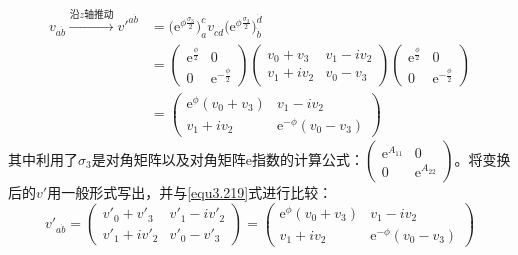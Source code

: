 \begin{align}
    v_{a\dot{b}} \stackrel{\text{沿} z \text{轴推动}}{\longrightarrow} v'^{a\dot{b}} &= \Big(\mathrm{e}^{\phi \frac{\sigma_3}{2}} \Big)^c_a v_{c \dot{d}} \Big( \mathrm{e}^{\phi \frac{\sigma_3}{2}} \Big)^{\dot{d}}_{\dot{b}} \nonumber \\
    &=  \begin{pmatrix}
            \mathrm{e}^{\frac{\phi}{2}} & 0 \\
            0 & \mathrm{e}^{- \frac{\phi}{2}}
        \end{pmatrix}
        \begin{pmatrix}
            v_0 + v_3 & v_1 - iv_2 \\
            v_1 + iv_2 & v_0 - v_3
        \end{pmatrix}
        \begin{pmatrix}
            \mathrm{e}^{\frac{\phi}{2}} & 0 \\
            0 & \mathrm{e}^{- \frac{\phi}{2}}
        \end{pmatrix}
        \nonumber \\
\label{equ3.219}
    &=  \begin{pmatrix}
            \mathrm{e}^{\phi} (v_0 + v_3) & v_1 - iv_2 \\
            v_1 + iv_2 & \mathrm{e}^{-\phi} (v_0 - v_3)
        \end{pmatrix}
\end{align}
其中利用了$\sigma_3$是对角矩阵以及对角矩阵$\mathrm{e}$指数的计算公式：$\begin{pmatrix} \mathrm{e}^{A_{11}} & 0 \\ 0 & \mathrm{e}^{A_{22}} \end{pmatrix}$。将变换后的$v'$用一般形式写出，并与\eqref{equ3.219}式进行比较：
\begin{equation*}
    v'_{a\dot{b}} =
        \begin{pmatrix}
            v'_0 + v'_3 & v'_1 - iv'_2 \\
            v'_1 + iv'_2 & v'_0 - v'_3
        \end{pmatrix}
    =
        \begin{pmatrix}
            \mathrm{e}^{\phi} (v_0 + v_3) & v_1 - iv_2 \\
            v_1 + iv_2 & \mathrm{e}^{-\phi} (v_0 - v_3)
        \end{pmatrix}
\end{equation*}
